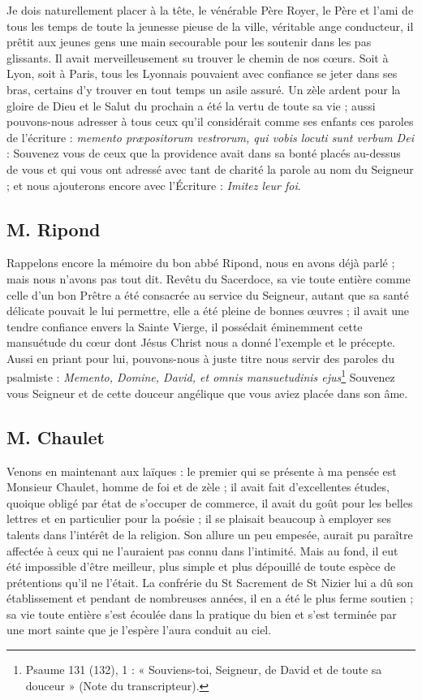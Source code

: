 \documentclass[11pt,a4paper]{report}
\begin{document}
Je dois naturellement placer à la tête, le vénérable Père Royer, le Père et l'ami de tous les temps de toute la jeunesse pieuse de la ville, véritable ange conducteur, il prêtit aux jeunes gens une main secourable pour les soutenir dans les pas glissants. Il avait merveilleusement su trouver le chemin de nos cœurs. Soit à Lyon, soit à Paris, tous les Lyonnais pouvaient avec confiance se jeter dans ses bras, certains d'y trouver en tout temps un asile assuré. Un zèle ardent pour la gloire de Dieu et le Salut du prochain a été la vertu de toute sa vie ; aussi pouvons-nous adresser à tous ceux qu'il considérait comme ses enfants ces paroles de l'écriture : \textit{memento præpositorum vestrorum, qui vobis locuti sunt verbum Dei} : Souvenez vous de ceux que la providence avait dans sa bonté placés au-dessus de vous et qui vous ont adressé avec tant de charité la parole au nom du Seigneur ; et nous ajouterons encore avec l'Écriture : \textit{Imitez leur foi}.

\subsection*{M. Ripond}

Rappelons encore la mémoire du bon abbé Ripond, nous en avons déjà parlé ; mais nous n'avons pas tout dit. Revêtu du Sacerdoce, sa vie toute entière comme celle d'un bon Prêtre a été consacrée au service du Seigneur, autant que sa santé délicate pouvait le lui permettre, elle a été pleine de bonnes œuvres ; il avait une tendre confiance envers la Sainte Vierge, il possédait éminemment cette mansuétude du cœur dont Jésus Christ nous a donné l'exemple et le précepte. Aussi en priant pour lui, pouvons-nous à juste titre nous servir des paroles du psalmiste : \textit{Memento, Domine, David, et omnis mansuetudinis ejus}\footnote{Psaume 131 (132), 1 : « Souviens-toi, Seigneur, de David et de toute sa douceur » (Note du transcripteur).} Souvenez vous Seigneur et de cette douceur angélique que vous aviez placée dans son âme.

\subsection*{M. Chaulet}

Venons en maintenant aux laïques : le premier qui se présente à ma pensée est Monsieur Chaulet, homme de foi et de zèle ; il avait fait d'excellentes études, quoique obligé par état de s'occuper de commerce, il avait du goût pour les belles lettres et en particulier pour la poésie ; il se plaisait beaucoup à employer ses talents dans l'intérêt de la religion. Son allure un peu empesée, aurait pu paraître affectée à ceux qui ne l'auraient pas connu dans l'intimité. Mais au fond, il eut été impossible d'être meilleur, plus simple et plus dépouillé de toute espèce de prétentions qu'il ne l'était. La confrérie du St Sacrement de St Nizier lui a dû son établissement et pendant de nombreuses années, il en a été le plus ferme soutien ; sa vie toute entière s'est écoulée dans la pratique du bien et s'est terminée par une mort sainte que je l'espère l'aura conduit au ciel.
\end{document}
